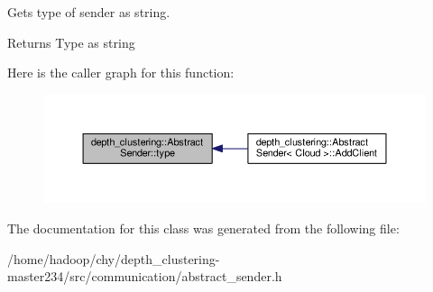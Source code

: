 Gets type of sender as string. 

\begin{DoxyReturn}{Returns}
Type as string 
\end{DoxyReturn}


Here is the caller graph for this function\-:
\nopagebreak
\begin{figure}[H]
\begin{center}
\leavevmode
\includegraphics[width=350pt]{classdepth__clustering_1_1AbstractSender_ad9da304185f766eb4b0035d6610caa49_icgraph}
\end{center}
\end{figure}




The documentation for this class was generated from the following file\-:\begin{DoxyCompactItemize}
\item 
/home/hadoop/chy/depth\-\_\-clustering-\/master234/src/communication/abstract\-\_\-sender.\-h\end{DoxyCompactItemize}
